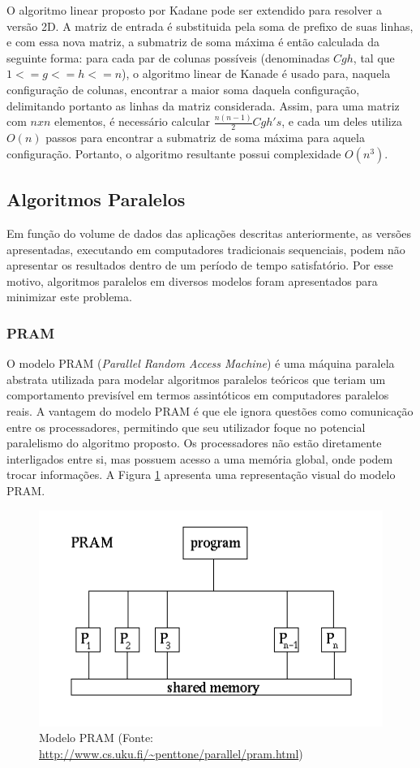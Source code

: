 \documentclass[a4paper, 12pt] {article}
\begin{document}
O algoritmo linear proposto por Kadane pode ser extendido para resolver a versão
2D. A matriz de entrada é substituida pela soma de prefixo de suas linhas, e com
essa nova matriz, a submatriz de soma máxima é então calculada da seguinte
forma: para cada par de colunas possíveis (denominadas $Cgh$, tal que $1 <= g
<= h <= n$), o algoritmo linear de Kanade é usado para, naquela configuração de
colunas, encontrar a maior soma daquela configuração, delimitando portanto as linhas da matriz considerada. Assim, para
uma matriz com $nxn$ elementos, é necessário calcular $\frac{n(n-1)}{2} Cgh's$,
e cada um deles utiliza $O(n)$ passos para encontrar a submatriz de soma máxima
para aquela configuração. Portanto, o algoritmo resultante possui complexidade
$O(n^3)$.

\subsection{Algoritmos Paralelos}

Em função do volume de dados das aplicações descritas anteriormente, as
versões apresentadas, executando em computadores tradicionais sequenciais, podem
não apresentar os resultados dentro de um período de tempo satisfatório. Por
esse motivo, algoritmos paralelos em diversos modelos foram
apresentados para minimizar este problema.

\subsubsection{PRAM}

O modelo PRAM (\textit{Parallel Random Access Machine}) é uma máquina paralela
abstrata utilizada para modelar algoritmos paralelos teóricos que teriam um
comportamento previsível em termos assintóticos em computadores paralelos reais.
A vantagem do modelo PRAM é que ele ignora questões como comunicação entre os
processadores, permitindo que seu utilizador foque no potencial paralelismo do
algoritmo proposto. Os processadores não estão diretamente interligados entre
si, mas possuem acesso a uma memória global, onde podem trocar informações. A
Figura \ref{fig:pram} apresenta uma representação visual do modelo PRAM. 

\begin{figure}[ht]
\centering
\includegraphics[width=.4\textwidth]{pram.png}
\caption{Modelo PRAM (Fonte:
\url{http://www.cs.uku.fi/~penttone/parallel/pram.html}) }
\label{fig:pram}
\end{figure}
\end{document}
